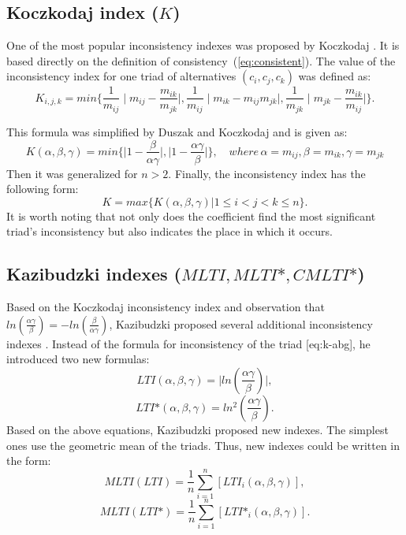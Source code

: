 \subsection{Koczkodaj index ($\textit{K}$)}

One of the most popular inconsistency indexes was proposed by Koczkodaj \cite{KOCZKODAJ1993}. It is based directly on the definition of consistency~(\ref{eq:consistent}). The value of the inconsistency index for one triad of alternatives $(c_i, c_j, c_k)$ was defined as:
	\begin{equation} 
		\label{eq:K}
		K_{i,j,k}=min\{\frac{1}{m_{ij}}\mid m_{ij}-\frac{m_{ik}}{m_{jk}}\mid,\frac{1}{m_{ij}}\mid m_{ik}-m_{ij}m_{jk}\mid,\frac{1}{m_{jk}}\mid m_{jk}-\frac{m_{ik}}{m_{ij}}\mid\}.
	 \end{equation}

 This formula was simplified by Duszak and Koczkodaj \cite{DUSZAK1994} and is given as:
 	\begin{equation} 
		K(\alpha,\beta,\gamma)=min\{\mid1-\frac{\beta}{\alpha\gamma}\mid,\mid1-\frac{\alpha\gamma}{\beta}\mid\},\,\,\,\,\,\,where\,\alpha=m_{ij},\beta=m_{ik},\gamma=m_{jk}
	 \end{equation}
 Then it was generalized \cite{DUSZAK1994} for $n>2$. Finally, the inconsistency index has the following form:
 	\begin{equation} 
		K=max\{K(\alpha,\beta,\gamma)|1\leq i<j<k\leq n\}.
	 \end{equation}
 It is worth noting that not only does the coefficient find the most significant triad's inconsistency but also indicates the place in which it occurs.


\subsection{Kazibudzki indexes ($\textit{MLTI}, \textit{MLTI*}, \textit{CMLTI*}$)}

Based on the Koczkodaj inconsistency index and observation that $ln(\frac{\alpha\gamma}{\beta})=-ln(\frac{\beta}{\alpha\gamma})$, Kazibudzki proposed several additional inconsistency indexes \cite{Kazibudzki2016}. Instead of the formula for inconsistency of the triad [eq:k-abg], he introduced two new formulas:
	\begin{equation} 
		\textit{LTI}(\alpha,\beta,\gamma)=\mid ln(\frac{\alpha\gamma}{\beta})\mid,
	 \end{equation}
	\begin{equation}
		\label{eq:lti*} 
		\textit{LTI*}(\alpha,\beta,\gamma)=ln^{2}(\frac{\alpha\gamma}{\beta}).
	 \end{equation}
Based on the above equations, Kazibudzki proposed new indexes. The simplest ones use the geometric mean of the triads. Thus, new indexes could be written in the form:
	\begin{equation} 
	\textit{MLTI}(\textit{LTI})=\frac{1}{n}\sum_{i=1}^{n}\left[\textit{LTI}_{i}(\alpha,\beta,\gamma)\right],
	 \end{equation}
 	\begin{equation} 
		\textit{MLTI}(\textit{LTI*})=\frac{1}{n}\sum_{i=1}^{n}\left[\textit{LTI*}_{i}(\alpha,\beta,\gamma)\right].
			 \end{equation}
 

